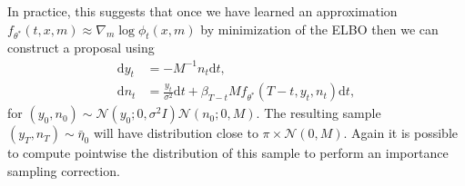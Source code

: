 \documentclass{article} %
\begin{document}
In practice, this suggests that once we have learned an approximation $f_{\theta^*}(t,x,m) \approx \nabla_m \log \phi_t(x,m)$ by minimization of the ELBO then we can construct a proposal using 
\begin{align}\label{eq:reversalODEunderdampedproposalSM}
    \mathrm{d}y_t&=-M^{-1}n_t\mathrm{d}t,\\
    \mathrm{d}n_t&= \frac{y_t}{\sigma^2}\mathrm{d}t+\beta_{T-t} M f_{\theta^*}(T-t,y_t,n_t) \mathrm{d}t,\nonumber
\end{align}
for $(y_0,n_0)\sim \mathcal{N}(y_0;0,\sigma^2I)\mathcal{N}(n_0;0,M)$. The resulting sample $(y_T,n_T) \sim \bar{\eta}_0$ will have distribution close to $\pi \times \mathcal{N}(0,M)$. Again it is possible to compute pointwise the distribution of this sample to perform an importance sampling correction.
\end{document}
